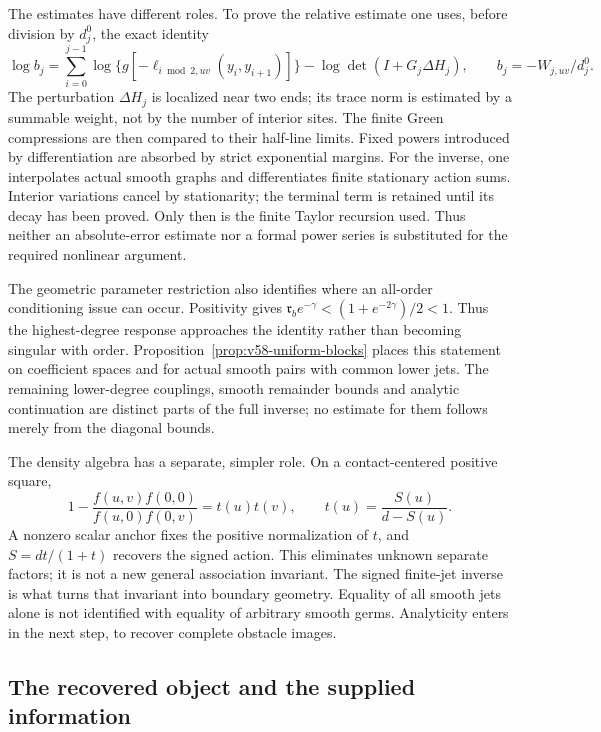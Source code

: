 The estimates have different roles.  To prove the relative estimate one
uses, before division by $d_j^0$, the exact identity
\begin{equation}\label{eq:v56-normalized-determinant}
 \log b_j=\sum_{i=0}^{j-1}
 \log\{g[-\ell_{i\bmod2,uv}(y_i,y_{i+1})]\}
                         -\log\det(I+G_j\Delta H_j),
 \qquad b_j=-W_{j,uv}/d_j^0.
\end{equation}
The perturbation $\Delta H_j$ is localized near two ends; its trace norm
is estimated by a summable weight, not by the number of interior sites.
The finite Green compressions are then compared to their half-line
limits.  Fixed powers introduced by differentiation are absorbed by
strict exponential margins.  For the inverse, one interpolates actual
smooth graphs and differentiates finite stationary action sums.  Interior
variations cancel by stationarity; the terminal term is retained until
its decay has been proved.  Only then is the finite Taylor recursion
used.  Thus neither an absolute-error estimate nor a formal power series
is substituted for the required nonlinear argument.

The geometric parameter restriction also identifies where an
all-order conditioning issue can occur.  Positivity gives
$\mathfrak r_b e^{-\gamma}<(1+e^{-2\gamma})/2<1$.
Thus the highest-degree response approaches the identity rather than
becoming singular with order.  Proposition~\ref{prop:v58-uniform-blocks}
places this statement on coefficient spaces and for actual smooth
pairs with common lower jets.  The remaining lower-degree couplings,
smooth remainder bounds and analytic continuation are distinct parts
of the full inverse; no estimate for them follows merely from the
diagonal bounds.

The density algebra has a separate, simpler role.  On a contact-centered
positive square,
\[
 1-\frac{f(u,v)f(0,0)}{f(u,0)f(0,v)}=t(u)t(v),
 \qquad t(u)=\frac{S(u)}{d-S(u)}.
\]
A nonzero scalar anchor fixes the positive normalization of $t$, and
$S=dt/(1+t)$ recovers the signed action.  This eliminates unknown
separate factors; it is not a new general association invariant.
The signed finite-jet inverse is what turns that invariant into
boundary geometry.  Equality of all smooth jets alone is not identified
with equality of arbitrary smooth germs.  Analyticity enters in the
next step, to recover complete obstacle images.



\subsection{The recovered object and the supplied information}

